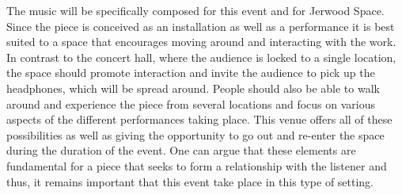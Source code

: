 	The music will be specifically composed for this event and for Jerwood Space. Since the piece is conceived as an installation as well as a performance it is best suited to a space that encourages moving around and interacting with the work. In contrast to the concert hall, where the audience is locked to a single location, the space should promote interaction and invite the audience to pick up the headphones, which will be spread around. People should also be able to walk around and experience the piece from several locations and focus on various aspects of the different performances taking place. This venue offers all of these possibilities as well as giving the opportunity to go out and re-enter the space during the duration of the event. One can argue that these elements are fundamental for a piece that seeks to form a relationship with the listener and thus, it remains important that this event take place in this type of setting. 
 
